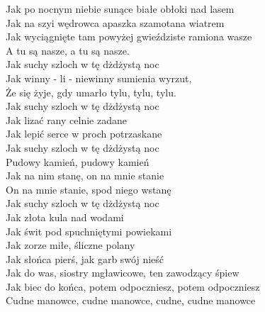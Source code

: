 
Jak po nocnym niebie sunące białe obłoki nad lasem \\
Jak na szyi wędrowca apaszka szamotana wiatrem \\
Jak wyciągnięte tam powyżej gwieździste ramiona wasze \\
A tu są nasze, a tu są nasze. \\
\hops
Jak suchy szloch w tę dżdżystą noc \\
Jak winny - li - niewinny sumienia wyrzut, \\
Że się żyje, gdy umarło tylu, tylu, tylu. \\
\hops
Jak suchy szloch w tę dżdżystą noc \\
Jak lizać rany celnie zadane \\
Jak lepić serce w proch potrzaskane \\
\hops
Jak suchy szloch w tę dżdżystą noc \\
Pudowy kamień, pudowy kamień \\
Jak na nim stanę, on na mnie stanie \\
On na mnie stanie, spod niego wstanę \\
\hops
Jak suchy szloch w tę dżdżystą noc \\
Jak złota kula nad wodami \\
Jak świt pod spuchniętymi powiekami \\
\hops
Jak zorze miłe, śliczne polany \\
Jak słońca pierś, jak garb swój nieść \\
Jak do was, siostry mgławicowe, ten zawodzący śpiew \\
\hops
Jak biec do końca, potem odpoczniesz, potem odpoczniesz \\
Cudne manowce, cudne manowce, cudne, cudne manowce \\